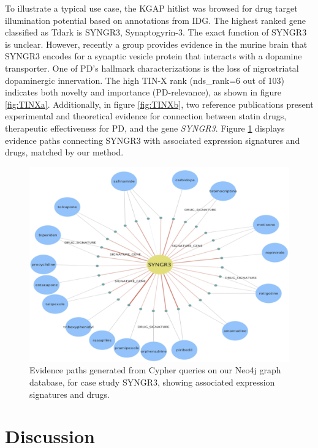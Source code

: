 To illustrate a typical use case, the KGAP hitlist was browsed for drug target illumination potential based on annotations from IDG. The highest ranked gene classified as Tdark is SYNGR3, Synaptogyrin-3. The exact function of SYNGR3 is unclear. However, recently a group provides evidence in the murine brain that SYNGR3 encodes for a synaptic vesicle protein that interacts with a dopamine transporter\cite{Egana2009-xo}. One of PD’s hallmark characterizations is the loss of nigrostriatal dopaminergic innervation\cite{Stoker2018-sf}. The high TIN-X rank (nds\_rank=6 out of 103) indicates both novelty and importance (PD-relevance), as shown in figure \ref{fig:TINXa}. Additionally, in figure \ref{fig:TINXb}, two reference publications present experimental and theoretical evidence for connection between statin drugs, therapeutic effectiveness for PD, and the gene \emph{SYNGR3}\cite{Schmitt2016-bf,Schmitt2017-du}. Figure \ref{fig:SYNGR3_subnet} displays evidence paths connecting SYNGR3 with associated expression signatures and drugs, matched by our method.

\begin{figure}
	\includegraphics[width=\textwidth]{figures/kgap/KGAP_SYNGR3_subnet.png}
	\caption{Evidence paths generated from Cypher queries on our Neo4j graph database, for case study SYNGR3, showing associated expression signatures and drugs.}
	\label{fig:SYNGR3_subnet}
\end{figure}

\section{Discussion}

